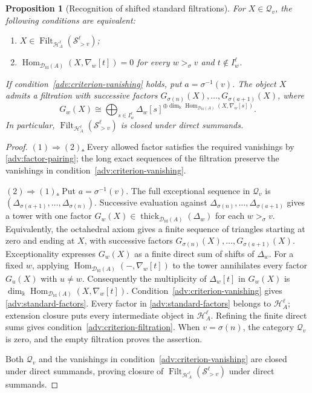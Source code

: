 \documentclass[11pt,a4paper]{article}
\newcommand{\D}{\mathcal D}
\renewcommand{\H}{\mathcal H}
\newcommand{\std}{\Delta}
\newcommand{\costd}{\nabla}
\DeclareMathOperator{\fd}{fd}
\DeclareMathOperator{\Hom}{Hom}
\DeclareMathOperator{\thick}{thick}
\DeclareMathOperator{\Filt}{Filt}
\theoremstyle{plain}
\newtheorem{proposition}[theorem]{Proposition}
\theoremstyle{definition}
\numberwithin{equation}{section}
\begin{document}
\begin{proposition}[Recognition of shifted standard filtrations]
\label{adv:criterion}
For $X\in\mathcal Q_v$, the following conditions are equivalent:
\begin{enumerate}[label=\textup{(\arabic*)}]
\item\label{adv:criterion-filtration}
$X\in\Filt_{\H_A^\ell}(\mathcal S_{>v}^\ell)$;
\item\label{adv:criterion-vanishing}
$\Hom_{\D_{\fd}(A)}(X,\costd_w[t])=0$ for every
$w>_\sigma v$ and $t\notin I_w^\ell$.
\end{enumerate}
If condition~\ref{adv:criterion-vanishing} holds, put
$a=\sigma^{-1}(v)$. The object $X$ admits a filtration with successive
factors $G_{\sigma(n)}(X),\ldots,G_{\sigma(a+1)}(X)$, where
\begin{equation}\label{adv:standard-factors}
 G_w(X)\cong\bigoplus_{s\in I_w^\ell}
 \std_w[s]^{\oplus\dim_{\Bbbk}
 \Hom_{\D_{\fd}(A)}(X,\costd_w[s])}.
\end{equation}
In particular, $\Filt_{\H_A^\ell}(\mathcal S_{>v}^\ell)$ is closed
under direct summands.
\end{proposition}
\begin{proof}
\noindent\underline{$(1)\Rightarrow(2)$.}
Every allowed factor satisfies the required vanishings by
\eqref{adv:factor-pairing}; the long exact sequences of the filtration
preserve the vanishings in condition~\ref{adv:criterion-vanishing}.

\noindent\underline{$(2)\Rightarrow(1)$.}
Put $a=\sigma^{-1}(v)$. The full exceptional sequence in
$\mathcal Q_v$ is
$(\std_{\sigma(a+1)},\ldots,\std_{\sigma(n)})$.
Successive evaluation against
$\std_{\sigma(n)},\ldots,\std_{\sigma(a+1)}$ gives a tower with
one factor $G_w(X)\in\thick_{\D_{\fd}(A)}(\std_w)$ for each
$w>_\sigma v$.
Equivalently, the octahedral axiom gives a finite sequence of triangles
starting at zero and ending at $X$, with successive factors
$G_{\sigma(n)}(X),\ldots,G_{\sigma(a+1)}(X)$.
Exceptionality expresses $G_w(X)$ as
a finite direct sum of shifts of $\std_w$.
For a fixed $w$, applying
$\Hom_{\D_{\fd}(A)}(-,\costd_w[t])$ to the tower annihilates every
factor $G_u(X)$ with $u\neq w$. Consequently the multiplicity
of $\std_w[t]$ in $G_w(X)$ is
$\dim_{\Bbbk}\Hom_{\D_{\fd}(A)}(X,\costd_w[t])$.
Condition~\ref{adv:criterion-vanishing} gives \eqref{adv:standard-factors}.
Every factor in \eqref{adv:standard-factors} belongs to $\H_A^\ell$;
extension closure puts every intermediate object in $\H_A^\ell$.
Refining the finite direct sums gives
condition~\ref{adv:criterion-filtration}.
When $v=\sigma(n)$, the category $\mathcal Q_v$ is zero, and the
empty filtration proves the assertion.

Both $\mathcal Q_v$ and the vanishings in
condition~\ref{adv:criterion-vanishing} are closed
under direct summands, proving closure of
$\Filt_{\H_A^\ell}(\mathcal S_{>v}^\ell)$ under direct summands.
\end{proof}
\end{document}
